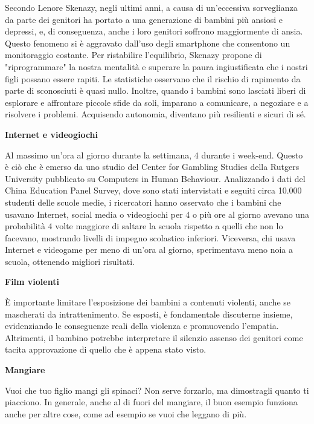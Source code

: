 \documentclass[12pt]{book} %
\begin{document}
Secondo Lenore Skenazy, negli ultimi anni, a causa di un'eccessiva sorveglianza da parte dei genitori ha portato a una generazione di bambini più ansiosi e depressi, e, di conseguenza, anche i loro genitori soffrono maggiormente di ansia. Questo fenomeno si è aggravato dall'uso degli smartphone che consentono un monitoraggio costante.
Per ristabilire l'equilibrio, Skenazy propone di "riprogrammare" la nostra mentalità e superare la paura ingiustificata che i nostri figli possano essere rapiti. Le statistiche osservano che il rischio di rapimento da parte di sconosciuti è quasi nullo. Inoltre, quando i bambini sono lasciati liberi di esplorare e affrontare piccole sfide da soli, imparano a comunicare, a negoziare e a risolvere i problemi. Acquisendo autonomia, diventano più resilienti e sicuri di sé.

\textbf{Internet e videogiochi}

Al massimo un'ora al giorno durante la settimana, 4 durante i week-end. Questo è ciò che è emerso da uno studio del
Center for Gambling Studies della Rutgers University pubblicato su Computers in Human Behaviour. Analizzando i dati del
China Education Panel Survey, dove sono stati intervistati e seguiti circa 10.000 studenti delle scuole medie, i
ricercatori hanno osservato che i bambini che usavano Internet, social media o videogiochi per 4 o più ore al giorno
avevano una probabilità 4 volte maggiore di saltare la scuola rispetto a quelli che non lo facevano, mostrando livelli
di impegno scolastico inferiori. Viceversa, chi usava Internet e videogame per meno di un'ora al giorno, sperimentava
meno noia a scuola, ottenendo migliori risultati. 

\textbf{Film violenti}

È importante limitare l’esposizione dei bambini a contenuti violenti, anche se mascherati da intrattenimento. Se esposti, è fondamentale discuterne insieme, evidenziando le conseguenze reali della violenza e promuovendo l’empatia. Altrimenti, il bambino potrebbe interpretare il silenzio assenso dei
genitori come tacita approvazione di quello che è appena stato visto.

\textbf{Mangiare}

Vuoi che tuo figlio mangi gli spinaci? Non serve forzarlo, ma dimostragli quanto ti piacciono. In generale, anche al di
fuori del mangiare, il buon esempio funziona anche per altre cose, come ad esempio se vuoi che leggano di più.
\end{document}
